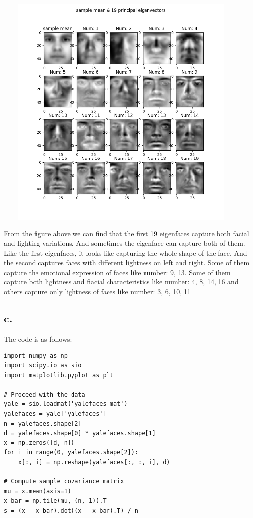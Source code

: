 \documentclass[letterpaper,11pt]{article}
\begin{document}
\begin{spacing}{1.2}
\includegraphics[width=4.95in,height=4.55in]{eigenfaces.png}

From the figure above we can find that the first 19 eigenfaces capture both facial and lighting variations. And sometimes the eigenface can capture both of them. Like the first eigenfaces, it looks like capturing the whole shape of the face. And the second captures faces with different lightness on left and right. Some of them capture the emotional expression of faces like number: 9, 13. Some of them capture both lightness and fiacial characteristics like number: 4, 8, 14, 16 and others capture only lightness of faces like number: 3, 6, 10, 11

\subsection*{c.}
The code is as follows:
\begin{lstlisting}
import numpy as np
import scipy.io as sio
import matplotlib.pyplot as plt

# Proceed with the data
yale = sio.loadmat('yalefaces.mat')
yalefaces = yale['yalefaces']
n = yalefaces.shape[2]
d = yalefaces.shape[0] * yalefaces.shape[1]
x = np.zeros([d, n])
for i in range(0, yalefaces.shape[2]):
    x[:, i] = np.reshape(yalefaces[:, :, i], d)

# Compute sample covariance matrix
mu = x.mean(axis=1)
x_bar = np.tile(mu, (n, 1)).T
s = (x - x_bar).dot((x - x_bar).T) / n


\end{lstlisting}
\end{spacing}
\end{document}
